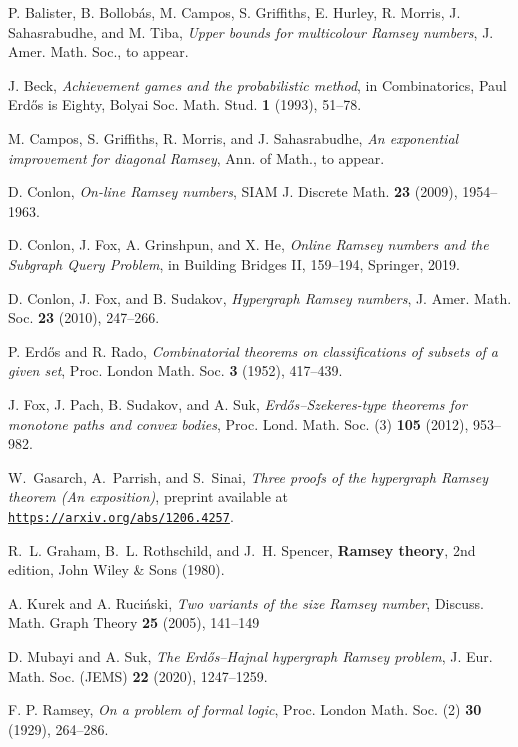 \documentclass[A4paper,reqno,oneside,12pt]{amsart}
\theoremstyle{plain}
\theoremstyle{definition}
\begin{document}
\begin{thebibliography}{}

P. Balister, B. Bollob\'as, M. Campos, S. Griffiths, E. Hurley, R. Morris, J. Sahasrabudhe, and M. Tiba,
{\it Upper bounds for multicolour Ramsey numbers},
J. Amer. Math. Soc.,
to appear.

J. Beck, 
{\it Achievement games and the probabilistic method}, 
in Combinatorics, Paul Erd\H{o}s is Eighty, Bolyai Soc. Math. Stud. {\bf 1} (1993), 51--78.

M. Campos, S. Griffiths, R. Morris, and J. Sahasrabudhe, 
{\it An exponential improvement for
diagonal Ramsey}, 
Ann. of Math., 
to appear.

D. Conlon,
{\it On-line Ramsey numbers}, 
SIAM J. Discrete Math. {\bf 23} (2009), 1954--1963.

D. Conlon, J. Fox, A. Grinshpun, and X. He,
{\it Online Ramsey numbers and the Subgraph Query Problem}, in Building Bridges II, 159--194, Springer, 2019.

D. Conlon, J. Fox, and B. Sudakov,
{\it Hypergraph Ramsey numbers},
J. Amer. Math. Soc. {\bf 23} (2010), 
247--266.


P. Erd\H{o}s and R. Rado, 
{\it Combinatorial theorems on classifications of subsets of a given set},
Proc. London Math. Soc. {\bf 3} (1952), 
417--439.

J. Fox, J. Pach, B. Sudakov, and A. Suk, 
{\it Erd\H{o}s--Szekeres-type theorems for monotone paths and
convex bodies}, 
Proc. Lond. Math. Soc. (3) {\bf 105} (2012), 
953--982.

W.~Gasarch, A.~Parrish, and S.~Sinai,
{\it Three proofs of the hypergraph Ramsey theorem (An exposition)},
preprint available at \href{https://arxiv.org/abs/1206.4257}{{\tt https://arxiv.org/abs/1206.4257}}.

R.~L. Graham, B.~L. Rothschild, and J.~H. Spencer,
{\bf Ramsey theory}, 
2nd edition, 
John Wiley \& Sons
(1980).

 A. Kurek and A. Ruci\'nski, 
 {\it Two variants of the size Ramsey number}, Discuss. Math. Graph Theory {\bf 25} (2005), 141--149

D. Mubayi and A. Suk, 
{\it The Erd\H{o}s--Hajnal hypergraph Ramsey problem}, 
J. Eur. Math. Soc. (JEMS) {\bf 22} (2020), 
1247--1259.

F. P. Ramsey, 
{\it On a problem of formal logic}, 
Proc. London Math. Soc. (2) {\bf 30} (1929),
264--286.

\end{thebibliography}
\end{document}
